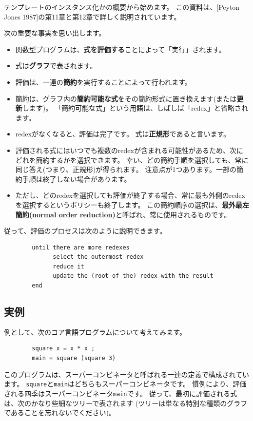 \documentclass{jbook}
\begin{document}
テンプレートのインスタンス化かの概要から始めます。
この資料は、[Peyton Jones 1987]の第11章と第12章で詳しく説明されています。

次の重要な事実を思い出します。

\begin{itemize}
	\item 関数型プログラムは、\textbf{式を評価する}ことによって「実行」されます。
	\item 式は\textbf{グラフ}で表されます。
	\item 評価は、一連の\textbf{簡約}を実行することによって行われます。
	\item 簡約は、グラフ内の\textbf{簡約可能な式}をその簡約形式に置き換えます(または\textbf{更新}します)。
	      「簡約可能な式」という用語は、しばしば「redex」と省略されます。
	\item redexがなくなると、評価は完了です。
	      式は\textbf{正規形}であると言います。
	\item 評価される式にはいつでも複数のredexが含まれる可能性があるため、次にどれを簡約するかを選択できます。
	      幸い、どの簡約手順を選択しても、常に同じ答え(つまり、正規形)が得られます。
	      注意点が1つあります。一部の簡約手順は終了しない場合があります。
	\item ただし、どのredexを選択しても評価が終了する場合、常に最も外側のredexを選択するというポリシーも終了します。
	      この簡約順序の選択は、\textbf{最外最左簡約(normal order reduction)}と呼ばれ、常に使用されるものです。
\end{itemize}

従って、評価のプロセスは次のように説明できます。

\begin{verbatim}
        until there are more redexes
              select the outermost redex
              reduce it
              update the (root of the) redex with the result
        end
\end{verbatim}

\subsection{実例}

例として、次のコア言語プログラムについて考えてみます。

\begin{verbatim}
        square x = x * x ;
        main = square (square 3)
\end{verbatim}

このプログラムは、スーパーコンビネータと呼ばれる一連の定義で構成されています。
\texttt{square}と\texttt{main}はどちらもスーパーコンビネータです。
慣例により、評価される四季はスーパーコンビネータ\texttt{main}です。
従って、最初に評価される式は、次のかなり些細なツリーで表されます
(ツリーは単なる特別な種類のグラフであることを忘れないでください)。
\end{document}
